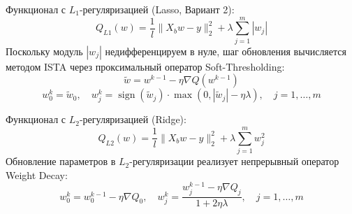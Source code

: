 \documentclass[14pt,a4paper]{extarticle}
\begin{document}
Функционал с $L_1$-регуляризацией (Lasso, Вариант 2):
\begin{equation}
    Q_{L1}(w) = \frac{1}{l} \|X_b w - y\|_2^2 + \lambda \sum_{j=1}^m |w_j|
\end{equation}
Поскольку модуль $|w_j|$ недифференцируем в нуле, шаг обновления вычисляется методом ISTA через проксимальный оператор Soft-Thresholding:
\begin{equation}
    \tilde{w} = w^{k-1} - \eta \nabla Q(w^{k-1})
\end{equation}
\begin{equation}
    w_0^k = \tilde{w}_0, \quad w_j^k = \operatorname{sign}(\tilde{w}_j) \cdot \max(0, |\tilde{w}_j| - \eta \lambda), \quad j = 1, \dots, m
\end{equation}

Функционал с $L_2$-регуляризацией (Ridge):
\begin{equation}
    Q_{L2}(w) = \frac{1}{l} \|X_b w - y\|_2^2 + \lambda \sum_{j=1}^m w_j^2
\end{equation}
Обновление параметров в $L_2$-регуляризации реализует непрерывный оператор Weight Decay:
\begin{equation}
    w_0^k = w_0^{k-1} - \eta \nabla Q_0, \quad w_j^k = \frac{w_j^{k-1} - \eta \nabla Q_j}{1 + 2 \eta \lambda}, \quad j = 1, \dots, m
\end{equation}

\end{document}
